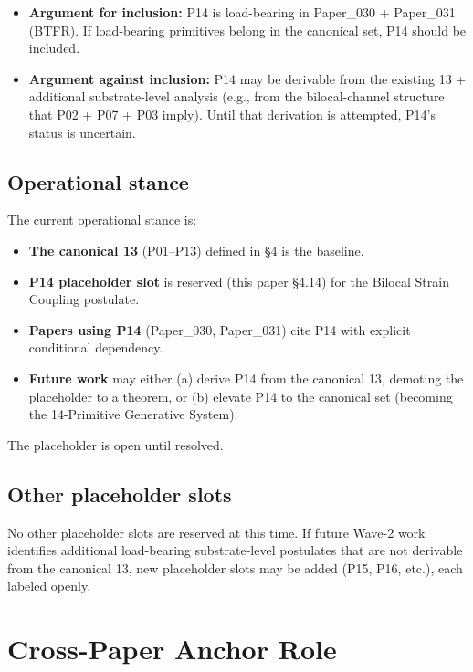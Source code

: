 \documentclass[11pt,a4paper]{article}
\begin{document}
\begin{itemize}[noitemsep]
\item \textbf{Argument for inclusion:} P14 is load-bearing in Paper\_030 + Paper\_031 (BTFR). If load-bearing primitives belong in the canonical set, P14 should be included.
\item \textbf{Argument against inclusion:} P14 may be derivable from the existing 13 + additional substrate-level analysis (e.g., from the bilocal-channel structure that P02 + P07 + P03 imply). Until that derivation is attempted, P14's status is uncertain.
\end{itemize}

\subsection{Operational stance}

The current operational stance is:

\begin{itemize}[noitemsep]
\item \textbf{The canonical 13} (P01--P13) defined in \S4 is the baseline.
\item \textbf{P14 placeholder slot} is reserved (this paper \S4.14) for the Bilocal Strain Coupling postulate.
\item \textbf{Papers using P14} (Paper\_030, Paper\_031) cite P14 with explicit conditional dependency.
\item \textbf{Future work} may either (a) derive P14 from the canonical 13, demoting the placeholder to a theorem, or (b) elevate P14 to the canonical set (becoming the 14-Primitive Generative System).
\end{itemize}

The placeholder is open until resolved.

\subsection{Other placeholder slots}

No other placeholder slots are reserved at this time. If future Wave-2 work identifies additional load-bearing substrate-level postulates that are not derivable from the canonical 13, new placeholder slots may be added (P15, P16, etc.), each labeled openly.

\section{Cross-Paper Anchor Role}
\end{document}
